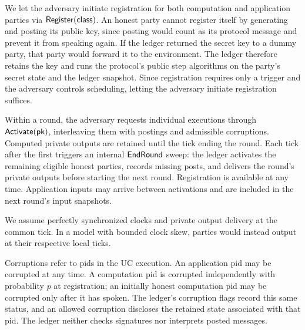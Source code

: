 We let the adversary initiate registration for both computation and application parties via $\mathsf{Register}(\mathsf{class})$. An honest party cannot register itself by generating and posting its public key, since posting would count as its protocol message and prevent it from speaking again. If the ledger returned the secret key to a dummy party, that party would forward it to the environment. The ledger therefore retains the key and runs the protocol's public step algorithms on the party's secret state and the ledger snapshot. Since registration requires only a trigger and the adversary controls scheduling, letting the adversary initiate registration suffices.

Within a round, the adversary requests individual executions through
$\mathsf{Activate}(\mathsf{pk})$, interleaving them with postings and admissible
corruptions.  Computed private outputs are retained until the tick ending
the round.  Each tick after the first triggers an internal $\mathsf{EndRound}$
sweep: the ledger activates the remaining eligible honest parties,
records missing posts, and delivers the round's private outputs before
starting the next round.
Registration is available at any time.  Application inputs may
arrive between activations and are included in the next round's input
snapshots.

We assume perfectly synchronized clocks and private output delivery at
the common tick.  In a model with bounded clock skew, parties would
instead output at their respective local ticks.

Corruptions refer to pids in the UC execution.  An application pid may be
corrupted at any time.  A computation pid is corrupted independently with
probability $p$ at registration; an initially honest computation pid may
be corrupted only after it has spoken.  The ledger's corruption flags
record this same status, and an allowed corruption discloses the retained
state associated with that pid.  The ledger neither checks signatures nor
interprets posted messages.

